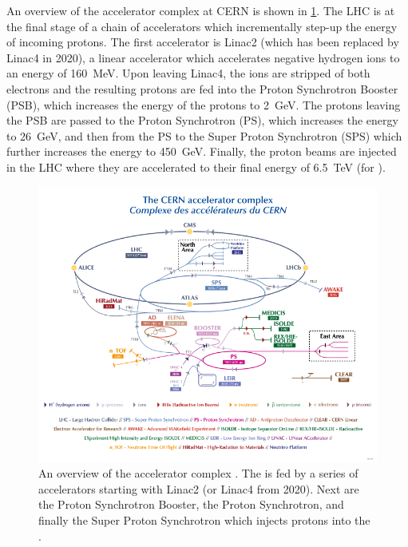 An overview of the accelerator complex at CERN is shown in \cref{fig:accelerator_complex}.
The LHC is at the final stage of a chain of accelerators which incrementally step-up the energy of incoming protons.
The first accelerator is Linac2 (which has been replaced by Linac4 in 2020), a linear accelerator which accelerates negative hydrogen ions to an energy of \SI{160}{\MeV}.
Upon leaving Linac4, the ions are stripped of both electrons and the resulting protons are fed into the Proton Synchrotron Booster (PSB), which increases the energy of the protons to \SI{2}{\GeV}.
The protons leaving the PSB are passed to the Proton Synchrotron (PS), which increases the energy to \SI{26}{\GeV}, and then from the PS to the Super Proton Synchrotron (SPS) which further increases the energy to \SI{450}{\GeV}.
Finally, the proton beams are injected in the LHC where they are accelerated to their final energy of \SI{6.5}{\TeV} (for \runtwo).

\begin{figure}[!htbp]
  \centering
  \includegraphics[width=\textwidth]{chapters/2.detector/figs/accelerator_complex.pdf}
  \caption{
    An overview of the \CERN accelerator complex \cite{CERN:2012:accelerators}.
    The \LHC is fed by a series of accelerators starting with Linac2 (or Linac4 from 2020).
    Next are the Proton Synchrotron Booster, the Proton Synchrotron, and finally the Super Proton Synchrotron which injects protons into the \LHC.
  }
  \label{fig:accelerator_complex}
\end{figure}


